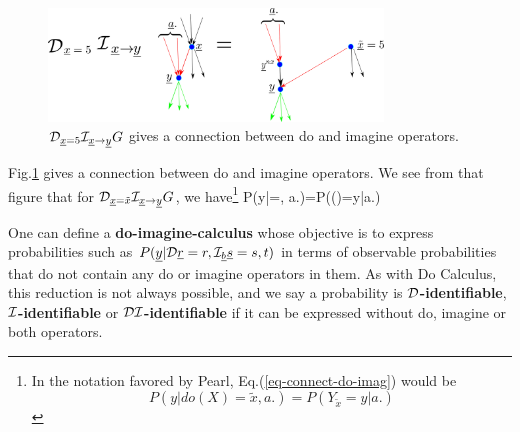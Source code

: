 \begin{figure}[h!]
\centering
\includegraphics[width=3.5in]
{counterf/rho-kappa.png}
\caption{${\cal D}_{{\underline{x}}=5}{\cal I}_{{\underline{x}}\rightarrow {\underline{y}}}G$
gives a connection
between do and imagine operators.
} 
\label{fig-rho-kappa}
\end{figure}

Fig.\ref{fig-rho-kappa}
gives  a connection
between do and imagine
operators.
We see
from that figure that
for ${\cal D}_{{\underline{x}}=\tilde{x}}
{\cal I}_{{\underline{x}}\rightarrow{\underline{y}}}G$, we have\footnote{In the
notation favored by Pearl, Eq.(\ref{eq-connect-do-imag})
 would be
$$P(y|do(X)=\tilde{x}, a.)=P(Y_{\tilde{x}}=y|a.)$$}
\beq
P(y|\cald\rvx=, a.)=P(\rvy()=y|a.)
\label{eq-connect-do-imag}
\eeq


One can define
a {\bf do-imagine-calculus}
whose
objective
is to 
express
probabilities such as 
$P({\underline{y}}|{\cal D}{\underline{r}}=r,
{\cal I}_{\underline{b}} {\underline{s}}=s, t)$
in terms of observable 
probabilities
that do not
contain
any do or imagine
operators in them.
As with
Do Calculus,
this reduction
is not 
always possible,
and we say a probability is
{\bf ${\cal D}$-identifiable},
{\bf ${\cal I}$-identifiable}
or
{\bf ${\cal D}{\cal I}$-identifiable}
if it  can be 
expressed without do, imagine
or both operators.

